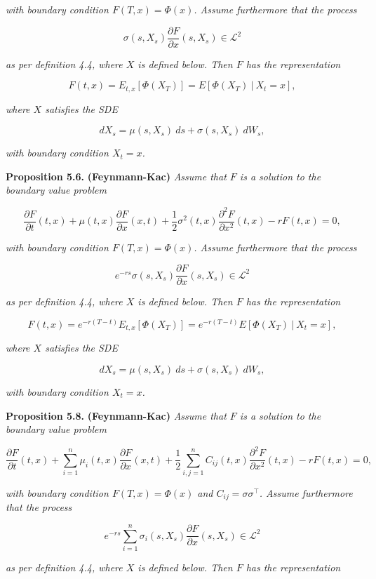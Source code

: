\documentclass[
]{article}
\begin{document}
\emph{with boundary condition \(F(T,x)=\Phi(x)\). Assume furthermore
that the process}

\[
\sigma(s,X_s)\frac{\partial F}{\partial x}(s,X_s) \in \mathcal{L}^2
\]

\emph{as per definition 4.4, where \(X\) is defined below. Then \(F\)
has the representation}

\[
F(t,x)=E_{t,x}[\Phi(X_T)]=E[\Phi(X_T)\ \vert\ X_t=x],\tag{5.29}
\]

\emph{where \(X\) satisfies the SDE}

\[
dX_s=\mu(s,X_s)\ ds+\sigma(s,X_s)\ dW_s,\tag{5.30}
\]

\emph{with boundary condition \(X_t=x\).}

\textbf{Proposition 5.6.} \textbf{(Feynmann-Kac)} \emph{Assume that
\(F\) is a solution to the boundary value problem}

\[
\frac{\partial F}{\partial t}(t,x)+\mu(t,x)\frac{\partial F}{\partial x}(x,t)+\frac{1}{2}\sigma^2(t,x)\frac{\partial^2 F}{\partial x^2}(t,x)-rF(t,x)=0,\tag{5.34}
\]

\emph{with boundary condition \(F(T,x)=\Phi(x)\). Assume furthermore
that the process}

\[
e^{-rs}\sigma(s,X_s)\frac{\partial F}{\partial x}(s,X_s) \in \mathcal{L}^2
\]

\emph{as per definition 4.4, where \(X\) is defined below. Then \(F\)
has the representation}

\[
F(t,x)=e^{-r(T-t)}E_{t,x}[\Phi(X_T)]=e^{-r(T-t)}E[\Phi(X_T)\ \vert\ X_t=x],\tag{5.36}
\]

\emph{where \(X\) satisfies the SDE}

\[
dX_s=\mu(s,X_s)\ ds+\sigma(s,X_s)\ dW_s,\tag{5.37}
\]

\emph{with boundary condition \(X_t=x\).}

\textbf{Proposition 5.8.} \textbf{(Feynmann-Kac)} \emph{Assume that
\(F\) is a solution to the boundary value problem}

\[
\frac{\partial F}{\partial t}(t,x)+\sum_{i=1}^n\mu_i(t,x)\frac{\partial F}{\partial x}(x,t)+\frac{1}{2}\sum_{i,j=1}^n C_{ij}(t,x)\frac{\partial^2 F}{\partial x^2}(t,x)-rF(t,x)=0,
\]

\emph{with boundary condition \(F(T,x)=\Phi(x)\) and
\(C_{ij}=\sigma \sigma^\top\). Assume furthermore that the process}

\[
e^{-rs}\sum_{i=1}^n\sigma_i(s,X_s)\frac{\partial F}{\partial x}(s,X_s) \in \mathcal{L}^2
\]

\emph{as per definition 4.4, where \(X\) is defined below. Then \(F\)
has the representation}
\end{document}
